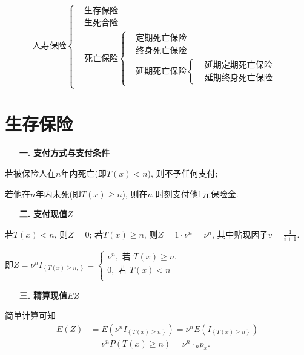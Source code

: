 \documentclass[a4paper,openany, 10pt]{ctexbook}
\newcommand{\hei}{\CJKfamily{hei}}      %
\def\no{\nonumber}
\begin{document}
\begin{equation*}
    \text{人寿保险}
    \begin{cases}
         & \text{生存保险}                                          \\
         & \text{生死合险}                                          \\
         & \text{死亡保险}\begin{cases}
                           & \text{定期死亡保险}                   \\
                           & \text{终身死亡保险}                   \\
                           & \text{延期死亡保险}\begin{cases}
                                 & \text{延期定期死亡保险} \\
                                 & \text{延期终身死亡保险}
                            \end{cases}
                      \end{cases}
    \end{cases}
\end{equation*}

\section{生存保险}
\begin{itemize}
    \item[{\bf\hei 一.}]{\bf\hei 支付方式与支付条件}
\end{itemize}

若被保险人在$n$年内死亡(即$T(x)<n$), 则不予任何支付;

若他在$n$年内未死(即$T(x)\geqslant n$), 则在$n$ 时刻支付他1元保险金.
\begin{itemize}
    \item[{\bf\hei 二.}]{\bf\hei 支付现值$Z$}
\end{itemize}

若$T(x)<n$, 则$Z=0$; 若$T(x)\geqslant n$, 则$Z=1\cdot \nu^n=\nu^n$, 其中贴现因子$v=\frac{1}{i+1}.$

即$Z=\nu^nI_{\left\{ T\left( x \right) \geqslant n, \right\}}=\left\{ \begin{array}{c}
        \nu^n, \text{ 若}\,\,T\left( x \right) \geqslant n. \\
        0,\text{ 若}\,\,T\left( x \right) <n            \\
    \end{array} \right.$
\begin{itemize}
    \item[{\bf\hei 三.}]{\bf\hei 精算现值$EZ$}
\end{itemize}
简单计算可知
\begin{align}
  E\left( Z \right) &=E\left( \nu^nI_{\left\{ T\left( x \right) \geqslant n \right\}} \right)=\nu^nE\left( I_{\left\{ T\left( x \right) \geqslant n \right\}} \right) \no\\ &
    =\nu^nP\left( T\left( x \right) \geqslant n \right) =\nu^n\cdot{}_np_x.\no
\end{align}
\end{document}
